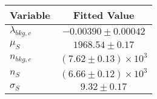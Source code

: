 \begin{tabular}[t]{lc}
\hline
Variable &Fitted Value\\
\hline\hline
$\lambda_{bkg,c}$&$-0.00390\pm0.00042$\\
\hline
$\mu_{S}$&$1968.54\pm0.17$\\
\hline
$n_{bkg,c}$&$(7.62\pm0.13)\times 10^3$\\
\hline
$n_{S}$&$(6.66\pm0.12)\times 10^3$\\
\hline
$\sigma_{S}$&$9.32\pm0.17$\\
\hline
\end{tabular}